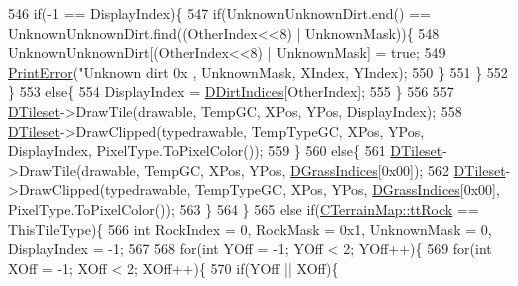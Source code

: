 \begin{DoxyCode}
{{{{{546                             \textcolor{keywordflow}{if}(-1 == DisplayIndex)\{
547                                 \textcolor{keywordflow}{if}(UnknownUnknownDirt.end() == UnknownUnknownDirt.find((OtherIndex<<8) | 
      UnknownMask))\{
548                                     UnknownUnknownDirt[(OtherIndex<<8) | UnknownMask] = \textcolor{keyword}{true};
549                                     \hyperlink{Debug_8h_a2ed825eefefe35baf59a93a8c641323d}{PrintError}(\textcolor{stringliteral}{"Unknown dirt 0x%
      , UnknownMask, XIndex, YIndex);   
550                                 \}
551                             \}
552                         \}
553                         \textcolor{keywordflow}{else}\{
554                             DisplayIndex = \hyperlink{classCMapRenderer_a5916c26aa5bedf8367a8f3f7efb457bf}{DDirtIndices}[OtherIndex];
555                         \}
556                         
557                         \hyperlink{classCMapRenderer_ace0648cba050b5e02431096edd15b836}{DTileset}->DrawTile(drawable, TempGC, XPos, YPos, DisplayIndex);   
558                         \hyperlink{classCMapRenderer_ace0648cba050b5e02431096edd15b836}{DTileset}->DrawClipped(typedrawable, TempTypeGC, XPos, YPos, DisplayIndex, 
      PixelType.ToPixelColor());
559                     \}
560                     \textcolor{keywordflow}{else}\{
561                         \hyperlink{classCMapRenderer_ace0648cba050b5e02431096edd15b836}{DTileset}->DrawTile(drawable, TempGC, XPos, YPos, 
      \hyperlink{classCMapRenderer_abea42ed77fce8a53ef0cfd6c82a5d676}{DGrassIndices}[0x00]);
562                         \hyperlink{classCMapRenderer_ace0648cba050b5e02431096edd15b836}{DTileset}->DrawClipped(typedrawable, TempTypeGC, XPos, YPos, 
      \hyperlink{classCMapRenderer_abea42ed77fce8a53ef0cfd6c82a5d676}{DGrassIndices}[0x00], PixelType.ToPixelColor());
563                     \}
564                 \}
565                 \textcolor{keywordflow}{else} \textcolor{keywordflow}{if}(\hyperlink{classCTerrainMap_aff2ab991e237269941416dd79d8871d4a215740f194a2d72a21d47c848fbfecad}{CTerrainMap::ttRock} == ThisTileType)\{
566                     \textcolor{keywordtype}{int} RockIndex = 0, RockMask = 0x1, UnknownMask = 0, DisplayIndex = -1;
567                     
568                     \textcolor{keywordflow}{for}(\textcolor{keywordtype}{int} YOff = -1; YOff < 2; YOff++)\{
569                         \textcolor{keywordflow}{for}(\textcolor{keywordtype}{int} XOff = -1; XOff < 2; XOff++)\{
570                             \textcolor{keywordflow}{if}(YOff || XOff)\{
}}}}}}
\end{DoxyCode}
